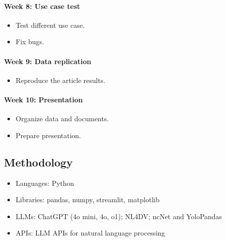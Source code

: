 \documentclass[conference]{IEEEtran}
\begin{document}
\paragraph{Week 8: Use case test}
\begin{itemize}
	\item Test different use case.
	\item Fix bugs.
\end{itemize}

\paragraph{Week 9: Data replication}
\begin{itemize}
	\item Reproduce the article results.
\end{itemize}

\paragraph{Week 10: Presentation}
\begin{itemize}
	\item Organize data and documents.
	\item Prepare presentation.
\end{itemize}


\subsection{Methodology}
\begin{itemize}
	\item Languages: Python
	\item Libraries: pandas, numpy, streamlit, matplotlib
	\item LLMs: ChatGPT (4o mini, 4o, o1); NL4DV; ncNet and YoloPandas
	\item APIs: LLM APIs for natural language processing 
\end{itemize}       



\end{document}
